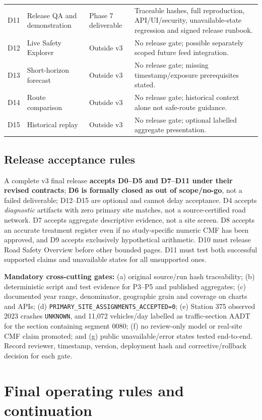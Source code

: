 \documentclass[11pt,a4paper,openany]{report}
\newcommand{\pathcode}[1]{\nolinkurl{#1}}
\begin{document}
\begin{longtable}{@{}L{10mm}L{42mm}L{29mm}L{62mm}@{}}
D11 & Release QA and demonstration & Phase 7 deliverable & Traceable hashes, full reproduction, API/UI/security, unavailable-state regression and signed release runbook.\\
D12 & Live Safety Explorer & Outside v3 & No release gate; possible separately scoped future feed integration.\\
D13 & Short-horizon forecast & Outside v3 & No release gate; missing timestamp/exposure prerequisites stated.\\
D14 & Route comparison & Outside v3 & No release gate; historical context alone not safe-route guidance.\\
D15 & Historical replay & Outside v3 & No release gate; optional labelled aggregate presentation.\\
\bottomrule\end{longtable}
\normalsize

\section{Release acceptance rules}
A complete v3 final release \textbf{accepts D0--D5 and D7--D11 under their revised contracts}; \textbf{D6 is formally closed as out of scope/no-go}, not a failed deliverable; D12--D15 are optional and cannot delay acceptance. D4 accepts \emph{diagnostic} artifacts with zero primary site matches, not a source-certified road network. D7 accepts aggregate descriptive evidence, not a site screen. D8 accepts an accurate treatment register even if no study-specific numeric CMF has been approved, and D9 accepts exclusively hypothetical arithmetic. D10 must release Road Safety Overview before other bounded pages. D11 must test both successful supported claims and unavailable states for all unsupported ones.

\textbf{Mandatory cross-cutting gates:} (a) original source/run hash traceability; (b) deterministic script and test evidence for P3--P5 and published aggregates; (c) documented year range, denominator, geographic grain and coverage on charts and APIs; (d) \pathcode{PRIMARY_SITE_ASSIGNMENTS_ACCEPTED=0}; (e) Station 375 observed 2023 crashes \pathcode{UNKNOWN}, and 11,072 vehicles/day labelled as traffic-section AADT for the section containing segment 0080; (f) no review-only model or real-site CMF claim promoted; and (g) public unavailable/error states tested end-to-end. Record reviewer, timestamp, version, deployment hash and corrective/rollback decision for each gate.

\chapter{Final operating rules and continuation}
\end{document}

